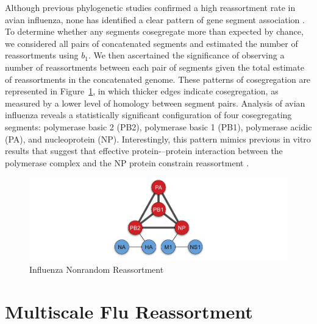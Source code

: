 Although previous phylogenetic studies confirmed a high reassortment rate in avian influenza, none has identified a clear pattern of gene segment association \cite{Dugan:2008iba}.
To determine whether any segments cosegregate more than expected by chance, we considered all pairs of concatenated segments and estimated the number of reassortments using $b_{1}$.
We then ascertained the significance of observing a number of reassortments between each pair of segments given the total estimate of reassortments in the concatenated genome.
These patterns of cosegregation are represented in Figure~\ref{fig:flu:nonrandom_reassortment}, in which thicker edges indicate cosegregation, as measured by a lower level of homology between segment pairs.
Analysis of avian influenza reveals a statistically significant configuration of four cosegregating segments: polymerase basic 2 (PB2), polymerase basic 1 (PB1), polymerase acidic (PA), and nucleoprotein (NP).
Interestingly, this pattern mimics previous in vitro results that suggest that effective protein-–protein interaction between the polymerase complex and the NP protein constrain reassortment \cite{Lubeck:1979ws}.

\begin{figure}
\begin{center}
\centerline{\includegraphics[width=\columnwidth]{./fig/influenza/flu_reassortment_correlations.pdf}}
\caption[Influenza Nonrandom Reassortment]{Influenza Nonrandom Reassortment}
\label{fig:flu:nonrandom_reassortment}
\end{center}
\end{figure}

\section{Multiscale Flu Reassortment}
\label{flu:multiscale_reassortment}

